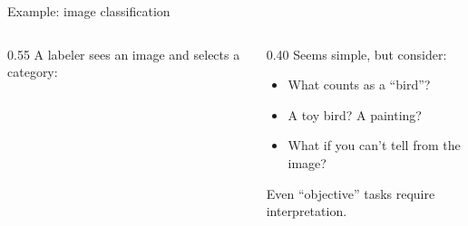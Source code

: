 \documentclass[aspectratio=169,11pt]{beamer}
\begin{document}
\begin{frame}{Example: image classification}

\begin{columns}[c]
\begin{column}{0.55\textwidth}
A labeler sees an image and selects a category:

\vspace{0.5em}


\vspace{0.5em}

\hfill \small \citep{nlperspectives2024}
\end{column}

\begin{column}{0.40\textwidth}
\small
Seems simple, but consider:
\begin{itemize}
  \item What counts as a ``bird''?
  \item A toy bird? A painting?
  \item What if you can't tell from the image?
\end{itemize}

\vspace{0.5em}

Even ``objective'' tasks require\\
interpretation.
\end{column}
\end{columns}
\end{frame}
\end{document}

